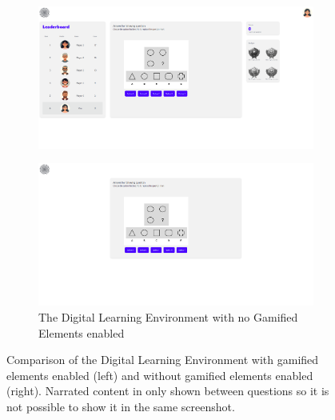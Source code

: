 \begin{figure}[H]
  \centering
  \begin{subfigure}[t]{0.4\textwidth}
    \includegraphics[width=\textwidth]{img/question_screen.png}
    \label{fig:figureScreenEnabled}
  \end{subfigure}
  \hspace{5mm}
  \begin{subfigure}[t]{0.4\textwidth}
    \includegraphics[width=\textwidth]{img/question_screen_no_elements.png}
    \caption{The Digital Learning Environment with no Gamified Elements enabled}
    \label{fig:figureScreenDisabled}
  \end{subfigure}
  \caption{Comparison of the Digital Learning Environment with gamified elements enabled (left) and without gamified elements enabled (right). Narrated content in only shown between questions so it is not possible to show it in the same screenshot.}
\end{figure}

